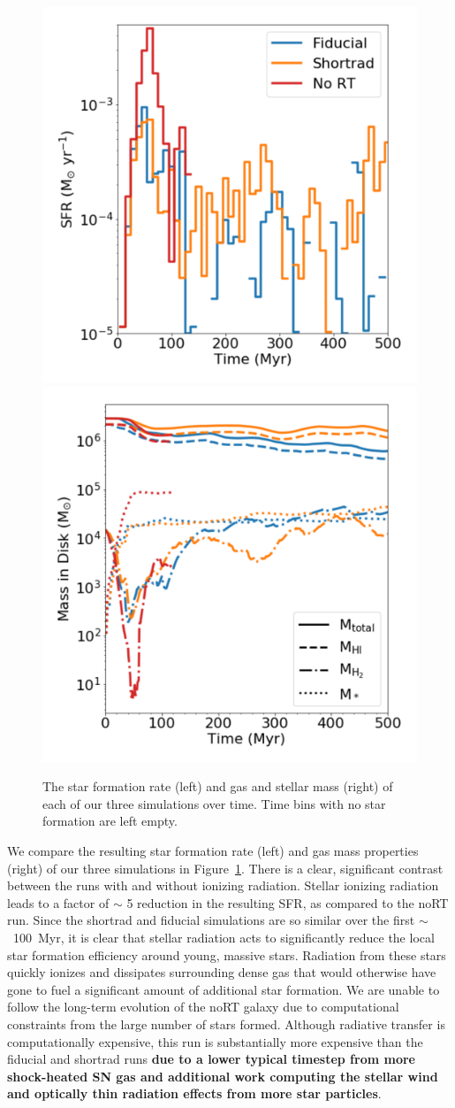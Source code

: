 \documentclass[twocolumn]{aastex62}
\begin{document}
{\begin{figure}
\centering
\includegraphics[width=0.49\linewidth]{sfr}
\includegraphics[width=0.49\linewidth]{mass}
\caption{The star formation rate (left) and gas and stellar mass (right) of each of our three simulations over time. Time bins with no star formation are left empty. }
\label{fig:sfr_mass_evolution}
\end{figure}

We compare the resulting star formation rate (left) and gas mass properties (right) of our three simulations in Figure~\ref{fig:sfr_mass_evolution}. There is a clear, significant contrast between the runs with and without ionizing radiation. Stellar ionizing radiation leads to a factor of $\sim$ 5 reduction in the resulting SFR, as compared to the noRT run. Since the shortrad and fiducial simulations are so similar over the first $\sim$~100~Myr, it is clear that stellar radiation acts to significantly reduce the local star formation efficiency around young, massive stars. Radiation from these stars quickly ionizes and dissipates surrounding dense gas that would otherwise have gone to fuel a significant amount of additional star formation. We are unable to follow the long-term evolution of the noRT galaxy due to computational constraints from the large number of stars formed. Although radiative transfer is computationally expensive, this run is substantially more expensive than the fiducial and shortrad runs \textbf{due to a lower typical timestep from more shock-heated SN gas and additional work computing the stellar wind and optically thin radiation effects from more star particles}. 

}
\end{document}
